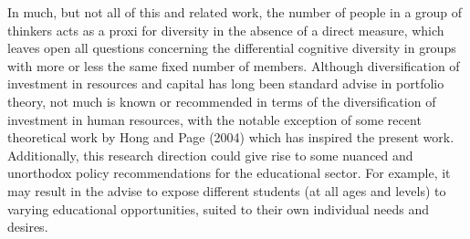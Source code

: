 \documentclass[11pt]{article}
\begin{document}
In much, but not all of this and related work, the number of people in a group of thinkers acts as a proxi for diversity in the absence of a direct measure, which leaves open all questions concerning the differential cognitive diversity in groups with more or less the same fixed number of members. Although diversification of investment in resources and capital has long been standard advise in portfolio theory, not much is known or recommended in terms of the diversification of investment in human resources, with the notable exception of some recent theoretical work by Hong and Page (2004) which has inspired the present work. Additionally, this research direction could give rise to some nuanced and unorthodox policy recommendations for the educational sector. For example, it may result in the advise to expose different students (at all ages and levels) to varying educational opportunities, suited to their own individual needs and desires.
\end{document}
